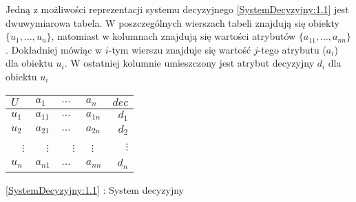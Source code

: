 \documentclass[magisterska]{pracamgr}
\theoremstyle{plain}
\theoremstyle{definition}
\theoremstyle{remark}
\begin{document}
Jedną z możliwości reprezentacji systemu decyzyjnego  \ref{SystemDecyzyjny:1.1} jest dwuwymiarowa tabela.
W poszczególnych wierszach tabeli znajdują się obiekty $\{u_1, \ldots, u_n \}$,
natomiast w kolumnach znajdują się wartości atrybutów $\{a_{11}, \ldots, a_{nn} \}$.
Dokładniej mówiąc w $i$-tym wierszu znajduje się wartość  $j$-tego atrybutu ($a_{i}$) dla obiektu $u_{i}$.
W ostatniej kolumnie umieszczony jest atrybut decyzyjny $d_{i}$ dla obiektu $u_i$

\begin{center}
  \begin{tabular}{  l || l l l | r }
  \label{SystemDecyzyjny:1.1}
    $U$ & $a_1$ & $\ldots$ & $a_n$ & $dec$ \\ 
    \hline
  
    $u_1$ & $a_{11}$ & $\ldots $ & $a_{1n} $ & $d_{1}$ \\
    $u_2$ & $a_{21}$ & $\ldots $ & $a_{2n} $ & $d_{2}$ \\ 
    \ \ $\vdots$ & \ \ $\vdots$ & \ \ $\vdots$ & \   $\vdots$ & $\vdots$ \\ 
    $u_n$ & $a_{n1}$ & $\ldots $ & $a_{nn} $ & $d_{n}$ \\     
  \end{tabular}\par
  \bigskip 
  \ref{SystemDecyzyjny:1.1} : System decyzyjny

\end{center}
\end{document}
